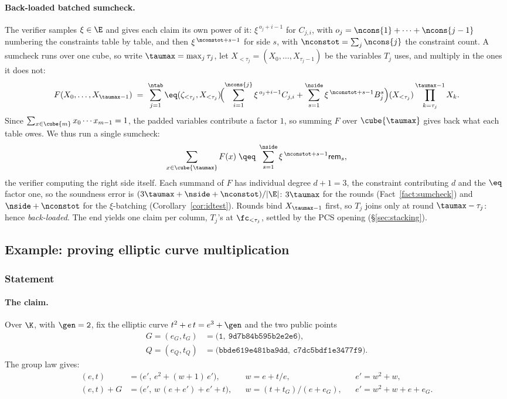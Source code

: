 \paragraph{Back-loaded batched sumcheck.} The verifier samples $\xi\in\E$ and gives each claim its own power of it: $\xi^{\,o_j+i-1}$ for $C_{j,i}$, with $o_j=\ncons{1}+\dots+\ncons{j-1}$ numbering the constraints table by table, and then $\xi^{\,\nconstot+s-1}$ for side $s$, with $\nconstot=\sum_j\ncons{j}$ the constraint count. A sumcheck runs over one cube, so write $\taumax=\max_j\tau_j$, let $X_{<\tau_j}=(X_0,\dots,X_{\tau_j-1})$ be the variables $T_j$ uses, and multiply in the ones it does not:
\[
  F(X_0,\dots,X_{\taumax-1})\;=\;\sum_{j=1}^{\ntab}\eq(\zeta_{<\tau_j},X_{<\tau_j})\!
  \Bigl(\sum_{i=1}^{\ncons{j}}\xi^{\,o_j+i-1}C_{j,i}+\sum_{s=1}^{\nside}\xi^{\,\nconstot+s-1}B^{s}_j\Bigr)(X_{<\tau_j})
  \prod_{k=\tau_j}^{\taumax-1}X_k .
\]
Since $\sum_{x\in\cube{m}}x_0\cdots x_{m-1}=1$, the padded variables contribute a factor $1$, so summing $F$ over $\cube{\taumax}$ gives back what each table owes. We thus run a single sumcheck:
\[
  \sum_{x\in\cube{\taumax}}F(x)\;\qeq\;\sum_{s=1}^{\nside}\xi^{\,\nconstot+s-1}\mathsf{rem}_{s},
\]
the verifier computing the right side itself. Each summand of $F$ has individual degree $d+1=3$, the constraint contributing $d$ and the $\eq$ factor one, so the soundness error is $(3\taumax+\nside+\nconstot)/|\E|$: $3\taumax$ for the rounds (Fact~\ref{fact:sumcheck}) and $\nside+\nconstot$ for the $\xi$-batching (Corollary~\ref{cor:idtest}). Rounds bind $X_{\taumax-1}$ first, so $T_j$ joins only at round $\taumax-\tau_j$: hence \emph{back-loaded}. The end yields one claim per column, $T_j$'s at $\fc_{<\tau_j}$, settled by the PCS opening (\S\ref{sec:stacking}).

\subsection{Example: proving elliptic curve multiplication}\label{sec:arith-example}

\subsubsection{Statement}

\paragraph{The claim.} Over $\K$, with $\gen=\mathtt{2}$, fix the elliptic curve $t^{2}+e\,t=e^{3}+\gen$ and the two public points
\begin{align*}
  G=(e_G,t_G)&=\bigl(\mathtt{1},\ \mathtt{9d7b84b595b2e2e6}\bigr),\\
  Q=(e_Q,t_Q)&=\bigl(\mathtt{bbde619e481ba9dd},\ \mathtt{c7dc5bdf1e3477f9}\bigr).
\end{align*}
The group law gives:
\begin{align*}
  [2](e,t)&=\bigl(e',\,e^{2}+(w+1)\,e'\bigr), &&w=e+t/e, &&e'=w^{2}+w,\\
  (e,t)+G&=\bigl(e',\,w\,(e+e')+e'+t\bigr), &&w=(t+t_G)/(e+e_G), &&e'=w^{2}+w+e+e_G .
\end{align*}

